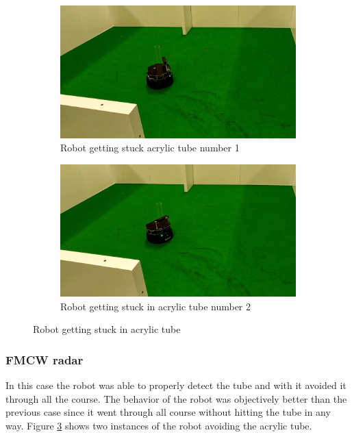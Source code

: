 \begin{figure}[ht!]
  \centering
  \begin{subfigure}[b]{0.49\linewidth}
    \includegraphics[width=\linewidth]{imgs/chapter5/glassLF1.png}
     \caption{Robot getting stuck acrylic tube number 1}
     \label{fig::glassRS1}
  \end{subfigure}
  \begin{subfigure}[b]{0.49\linewidth}
    \includegraphics[width=\linewidth]{imgs/chapter5/glassLF2.png}
    \caption{Robot getting stuck in acrylic tube  number 2}
    \label{fig::glassRS2}
  \end{subfigure}
  \caption{Robot getting stuck in acrylic tube}
  \label{fig:glassRS}
\end{figure}

\subsubsection*{FMCW radar}
In this case the robot was able to properly detect the tube and with it avoided it through all the course. The behavior of the robot was objectively better than the previous case since it went through all course without hitting the tube in any way. Figure \ref{fig:glassRS} shows two instances of the robot avoiding the acrylic tube.

